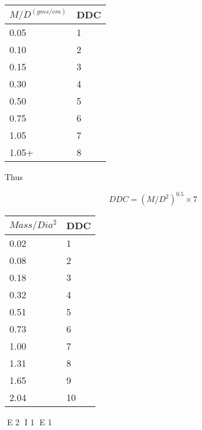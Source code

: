 \begin{tabular}{ll} \hline 
\(M/D^{(gms/cm)} \)	&	DDC \\ \hline 
0.05				& 1 \\
0.10       	        & 2  \\
0.15				& 3 \\
0.30				& 4 \\
0.50				& 5 \\
0.75				& 6 \\
1.05				& 7 \\
1.05+				& 8 \\ \hline 
\end{tabular}

Thus 

\[ DDC = ( M/{D^2} ) ^ 0.5  \times 7 \]

\begin{tabular}{ll} \hline 
\(Mass/Dia^{2}\)    & DDC \\ \hline 
0.02			& 1 \\
0.08			& 2 \\
0.18			& 3 \\
0.32			& 4 \\
0.51			& 5 \\
0.73			& 6 \\
1.00			& 7 \\
1.31			& 8 \\
1.65			& 9 \\
2.04			& 10 \\ \hline 
\end{tabular}


E 2
I 1
E 1
